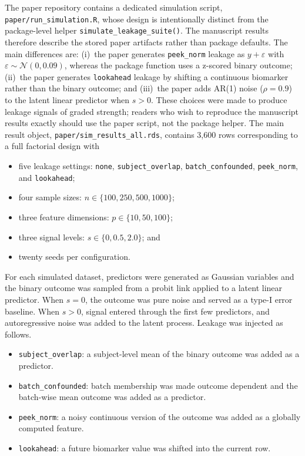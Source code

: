 \documentclass[article]{jss}
\begin{document}
The paper repository contains a dedicated simulation script,
\texttt{paper/run\_simulation.R}, whose design is intentionally distinct from
the package-level helper \texttt{simulate\_leakage\_suite()}. The manuscript
results therefore describe the stored paper artifacts rather than package
defaults. The main differences are: (i)~the paper generates
\texttt{peek\_norm} leakage as $y + \varepsilon$ with $\varepsilon \sim
\mathcal{N}(0, 0.09)$, whereas the package function uses a z-scored binary
outcome; (ii)~the paper generates \texttt{lookahead} leakage by shifting a
continuous biomarker rather than the binary outcome; and (iii)~the paper adds
AR(1) noise ($\rho = 0.9$) to the latent linear predictor when $s > 0$. These
choices were made to produce leakage signals of graded strength; readers who
wish to reproduce the manuscript results exactly should use the paper script,
not the package helper. The main result object, \texttt{paper/sim\_results\_all.rds},
contains 3{,}600 rows corresponding to a full factorial design with
\begin{itemize}
\item five leakage settings:
\texttt{none}, \texttt{subject\_overlap}, \texttt{batch\_confounded},
\texttt{peek\_norm}, and \texttt{lookahead};
\item four sample sizes: $n \in \{100, 250, 500, 1000\}$;
\item three feature dimensions: $p \in \{10, 50, 100\}$;
\item three signal levels: $s \in \{0, 0.5, 2.0\}$; and
\item twenty seeds per configuration.
\end{itemize}

For each simulated dataset, predictors were generated as Gaussian variables and
the binary outcome was sampled from a probit link applied to a latent linear
predictor. When $s = 0$, the outcome was pure noise and served as a type-I
error baseline. When $s > 0$, signal entered through the first few predictors,
and autoregressive noise was added to the latent process. Leakage was injected
as follows.
\begin{itemize}
\item \texttt{subject\_overlap}: a subject-level mean of the binary outcome was
added as a predictor.
\item \texttt{batch\_confounded}: batch membership was made outcome dependent
and the batch-wise mean outcome was added as a predictor.
\item \texttt{peek\_norm}: a noisy continuous version of the outcome was added
as a globally computed feature.
\item \texttt{lookahead}: a future biomarker value was shifted into the current
row.
\end{itemize}
\end{document}
